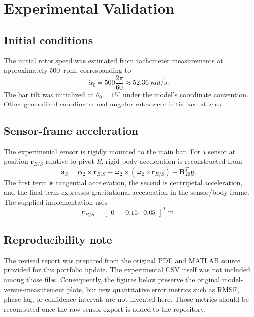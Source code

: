 \documentclass[11pt]{article}
\newcommand{\vect}[1]{\bm{#1}}
\newcommand{\mat}[1]{\bm{#1}}
\newcommand{\R}{\mat{R}}
\begin{document}
\section{Experimental Validation}
\subsection{Initial conditions}
The initial rotor speed was estimated from tachometer measurements at approximately \SI{500}{rpm}, corresponding to
\begin{equation}
    \dot{\alpha}_0 = 500\frac{2\pi}{60}
    \approx \SI{52.36}{rad/s}.
\end{equation}
The bar tilt was initialized at $\theta_0=15^{\circ}$ under the model's coordinate convention. Other generalized coordinates and angular rates were initialized at zero.

\subsection{Sensor-frame acceleration}
The experimental sensor is rigidly mounted to the main bar. For a sensor at position $\vect{r}_{B/S}$ relative to pivot $B$, rigid-body acceleration is reconstructed from
\begin{equation}
    \vect{a}_{S}
    = \vect{\alpha}_2\times\vect{r}_{B/S}
    + \vect{\omega}_2\times\left(\vect{\omega}_2\times\vect{r}_{B/S}\right)
    - \R_{20}^{T}\vect{g}.
\label{eq:sensoracc}
\end{equation}
The first term is tangential acceleration, the second is centripetal acceleration, and the final term expresses gravitational acceleration in the sensor/body frame. The supplied implementation uses
\begin{equation}
    \vect{r}_{B/S}=\begin{bmatrix}0&-0.15&0.05\end{bmatrix}^{T}\;\mathrm{m}.
\end{equation}

\subsection{Reproducibility note}
The revised report was prepared from the original PDF and MATLAB source provided for this portfolio update. The experimental CSV itself was not included among those files. Consequently, the figures below preserve the original model-versus-measurement plots, but new quantitative error metrics such as RMSE, phase lag, or confidence intervals are not invented here. Those metrics should be recomputed once the raw sensor export is added to the repository.
\end{document}
